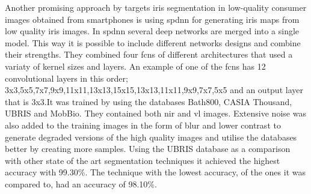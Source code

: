 Another promising approach by \cite{Bazrafkan2017} targets iris segmentation in low-quality consumer images obtained from smartphones is using \gls{spdnn} for generating iris maps from low quality iris images.  In \gls{spdnn} several deep networks are merged into a single model. This way it is possible to include different networks designs and combine their strengths. They combined four \gls{fcn}s of different architectures that used a variaty of kernel sizes and layers. An example of one of the \gls{fcn}s has 12 convolutional layers  in this order; 3x3,5x5,7x7,9x9,11x11,13x13,15x15,13x13,11x11,9x9,7x7,5x5 and an output layer that is 3x3.It was trained by using the databases Bath800, CASIA Thousand, UBRIS and MobBio. They contained both \gls{nir} and \gls{vl} images. Extensive noise was also added to the training images in the form of blur and lower contrast to generate degraded versions of the high quality images and utilise the databases better by creating more samples. Using the UBRIS database as a comparison with other state of the art segmentation techniques it achieved the highest accuracy with 99.30\%. The technique with the lowest accuracy, of the ones it was compared to, had an accuracy of 98.10\%.   











